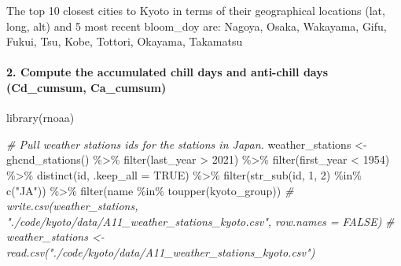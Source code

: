 \documentclass[
]{article}
\newenvironment{Shaded}{\begin{snugshade}}{\end{snugshade}}
\newcommand{\AttributeTok}[1]{\textcolor[rgb]{0.77,0.63,0.00}{#1}}
\newcommand{\CommentTok}[1]{\textcolor[rgb]{0.56,0.35,0.01}{\textit{#1}}}
\newcommand{\ConstantTok}[1]{\textcolor[rgb]{0.00,0.00,0.00}{#1}}
\newcommand{\DecValTok}[1]{\textcolor[rgb]{0.00,0.00,0.81}{#1}}
\newcommand{\FunctionTok}[1]{\textcolor[rgb]{0.00,0.00,0.00}{#1}}
\newcommand{\NormalTok}[1]{#1}
\newcommand{\OtherTok}[1]{\textcolor[rgb]{0.56,0.35,0.01}{#1}}
\newcommand{\SpecialCharTok}[1]{\textcolor[rgb]{0.00,0.00,0.00}{#1}}
\newcommand{\StringTok}[1]{\textcolor[rgb]{0.31,0.60,0.02}{#1}}
\begin{document}
The top 10 closest cities to Kyoto in terms of their geographical
locations (lat, long, alt) and 5 most recent bloom\_doy are: Nagoya,
Osaka, Wakayama, Gifu, Fukui, Tsu, Kobe, Tottori, Okayama, Takamatsu

\newpage

\hypertarget{compute-the-accumulated-chill-days-and-anti-chill-days-cd_cumsum-ca_cumsum}{%
\paragraph{2. Compute the accumulated chill days and anti-chill days
(Cd\_cumsum,
Ca\_cumsum)}\label{compute-the-accumulated-chill-days-and-anti-chill-days-cd_cumsum-ca_cumsum}}

\begin{Shaded}
\begin{Highlighting}[]
\FunctionTok{library}\NormalTok{(rnoaa)}

\CommentTok{\# Pull weather stations ids for the stations in Japan.}
\NormalTok{weather\_stations }\OtherTok{\textless{}{-}} \FunctionTok{ghcnd\_stations}\NormalTok{() }\SpecialCharTok{\%\textgreater{}\%}
    \FunctionTok{filter}\NormalTok{(last\_year }\SpecialCharTok{\textgreater{}} \DecValTok{2021}\NormalTok{) }\SpecialCharTok{\%\textgreater{}\%}
    \FunctionTok{filter}\NormalTok{(first\_year }\SpecialCharTok{\textless{}} \DecValTok{1954}\NormalTok{) }\SpecialCharTok{\%\textgreater{}\%}
    \FunctionTok{distinct}\NormalTok{(id, }\AttributeTok{.keep\_all =} \ConstantTok{TRUE}\NormalTok{) }\SpecialCharTok{\%\textgreater{}\%}
    \FunctionTok{filter}\NormalTok{(}\FunctionTok{str\_sub}\NormalTok{(id, }\DecValTok{1}\NormalTok{, }\DecValTok{2}\NormalTok{) }\SpecialCharTok{\%in\%} \FunctionTok{c}\NormalTok{(}\StringTok{"JA"}\NormalTok{)) }\SpecialCharTok{\%\textgreater{}\%}
    \FunctionTok{filter}\NormalTok{(name }\SpecialCharTok{\%in\%} \FunctionTok{toupper}\NormalTok{(kyoto\_group))}
\CommentTok{\# write.csv(weather\_stations, "./code/kyoto/data/A11\_weather\_stations\_kyoto.csv", row.names = FALSE)}
\CommentTok{\# weather\_stations \textless{}{-} read.csv("./code/kyoto/data/A11\_weather\_stations\_kyoto.csv")}


\end{Highlighting}
\end{Shaded}
\end{document}
